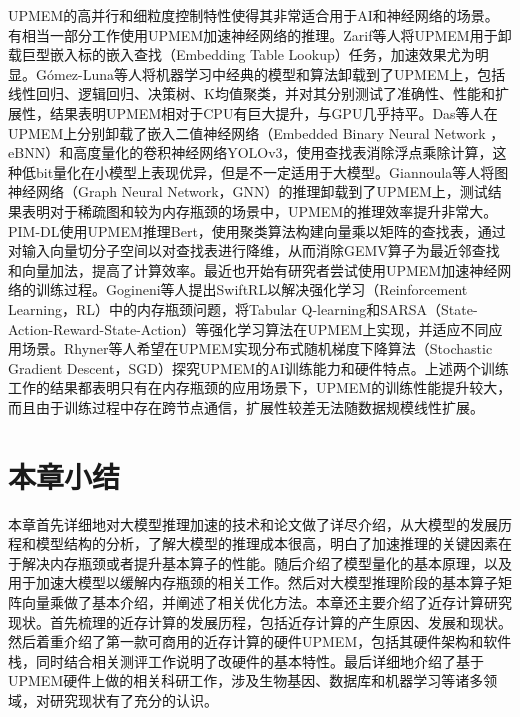 UPMEM的高并行和细粒度控制特性使得其非常适合用于AI和神经网络的场景。有相当一部分工作使用UPMEM加速神经网络的推理。Zarif等人\cite{UPMEMEmbeddingLookups}将UPMEM用于卸载巨型嵌入标的嵌入查找（Embedding Table Lookup）任务，加速效果尤为明显。Gómez-Luna等人\cite{UPMEMTraditionalML}将机器学习中经典的模型和算法卸载到了UPMEM上，包括线性回归、逻辑回归、决策树、K均值聚类，并对其分别测试了准确性、性能和扩展性，结果表明UPMEM相对于CPU有巨大提升，与GPU几乎持平。Das等人\cite{UPMEMCNN}在UPMEM上分别卸载了嵌入二值神经网络（Embedded Binary Neural Network ，eBNN）和高度量化的卷积神经网络YOLOv3，使用查找表消除浮点乘除计算，这种低bit量化在小模型上表现优异，但是不一定适用于大模型。Giannoula等人\cite{UPMEMGNN}将图神经网络（Graph Neural Network，GNN）的推理卸载到了UPMEM上，测试结果表明对于稀疏图和较为内存瓶颈的场景中，UPMEM的推理效率提升非常大。PIM-DL\cite{PIM-DL}使用UPMEM推理Bert，使用聚类算法构建向量乘以矩阵的查找表，通过对输入向量切分子空间以对查找表进行降维，从而消除GEMV算子为最近邻查找和向量加法，提高了计算效率。最近也开始有研究者尝试使用UPMEM加速神经网络的训练过程。Gogineni等人\cite{SwiftRL}提出SwiftRL以解决强化学习（Reinforcement Learning，RL）中的内存瓶颈问题，将Tabular Q-learning和SARSA（State-Action-Reward-State-Action）等强化学习算法在UPMEM上实现，并适应不同应用场景。Rhyner等人\cite{PIM-Opt}希望在UPMEM实现分布式随机梯度下降算法（Stochastic Gradient Descent，SGD）探究UPMEM的AI训练能力和硬件特点。上述两个训练工作的结果都表明只有在内存瓶颈的应用场景下，UPMEM的训练性能提升较大，而且由于训练过程中存在跨节点通信，扩展性较差无法随数据规模线性扩展。

\section{本章小结}
本章首先详细地对大模型推理加速的技术和论文做了详尽介绍，从大模型的发展历程和模型结构的分析，了解大模型的推理成本很高，明白了加速推理的关键因素在于解决内存瓶颈或者提升基本算子的性能。随后介绍了模型量化的基本原理，以及用于加速大模型以缓解内存瓶颈的相关工作。然后对大模型推理阶段的基本算子矩阵向量乘做了基本介绍，并阐述了相关优化方法。本章还主要介绍了近存计算研究现状。首先梳理的近存计算的发展历程，包括近存计算的产生原因、发展和现状。然后着重介绍了第一款可商用的近存计算的硬件UPMEM，包括其硬件架构和软件栈，同时结合相关测评工作说明了改硬件的基本特性。最后详细地介绍了基于UPMEM硬件上做的相关科研工作，涉及生物基因、数据库和机器学习等诸多领域，对研究现状有了充分的认识。